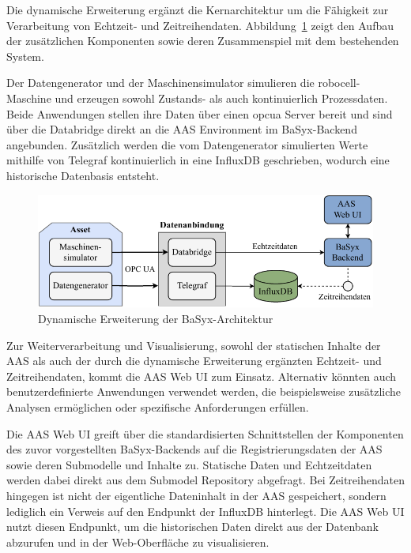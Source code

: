 Die dynamische Erweiterung ergänzt die Kernarchitektur um die Fähigkeit zur Verarbeitung von Echtzeit- und Zeitreihendaten. 
Abbildung~\ref{fig:DynamischeErweiterungArchitektur} zeigt den Aufbau der zusätzlichen Komponenten sowie deren Zusammenspiel mit dem bestehenden System.

Der Datengenerator und der Maschinensimulator simulieren die robocell-Maschine und erzeugen sowohl Zustands- als auch kontinuierlich Prozessdaten. 
Beide Anwendungen stellen ihre Daten über einen \acs{opcua} Server bereit und sind über die Databridge direkt an die AAS Environment im BaSyx-Backend angebunden.
Zusätzlich werden die vom Datengenerator simulierten Werte mithilfe von Telegraf kontinuierlich in eine InfluxDB geschrieben, wodurch eine historische Datenbasis entsteht. 


\newpage
\begin{figure}[htbp]
    \centering
        \includegraphics[width=1\textwidth]{Bilder/Ergebnisse/Systemarchitektur/DynamischeErwweiterungNeu.pdf}
    \caption{Dynamische Erweiterung der BaSyx-Architektur}
    \label{fig:DynamischeErweiterungArchitektur}
\end{figure}

\vspace{-0.5em}
Zur Weiterverarbeitung und Visualisierung, sowohl der statischen Inhalte der AAS als auch der durch die dynamische Erweiterung ergänzten Echtzeit- und Zeitreihendaten, kommt die AAS Web UI zum Einsatz. 
Alternativ könnten auch benutzerdefinierte Anwendungen verwendet werden, die beispielsweise zusätzliche Analysen ermöglichen oder spezifische Anforderungen erfüllen.

Die AAS Web UI greift über die standardisierten Schnittstellen der Komponenten des zuvor vorgestellten BaSyx-Backends auf die Registrierungsdaten der AAS sowie deren Submodelle und Inhalte zu. 
Statische Daten und Echtzeitdaten werden dabei direkt aus dem Submodel Repository abgefragt. 
Bei Zeitreihendaten hingegen ist nicht der eigentliche Dateninhalt in der AAS gespeichert, sondern lediglich ein Verweis auf den Endpunkt der InfluxDB hinterlegt. 
Die AAS Web UI nutzt diesen Endpunkt, um die historischen Daten direkt aus der Datenbank abzurufen und in der Web-Oberfläche zu visualisieren.

